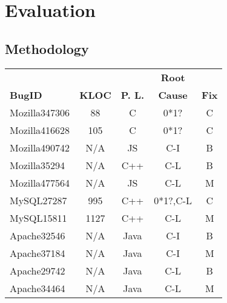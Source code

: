 \section{Evaluation}
\label{sec:6_experiment}

\subsection{Methodology}
\label{sec:6_result_meth}


\begin{table}
  \centering
  \scriptsize
  \newcommand{\Yes}[1]{\checkmark{}$_#1$}
  \newcommand{\No}[0]{-}
  \begin{tabular}{lcccc}
    \toprule
                         &      	   &                        & {\bf Root}   &          \\
   {\bf BugID}           &  {\bf KLOC}     &  {\bf P. L.}           & {\bf Cause}  & {\bf Fix}\\
   \midrule
   Mozilla347306         & 88              & C                      &  0*1?        & C     \\
   Mozilla416628         & 105             & C                      &  0*1?        & C     \\
   Mozilla490742         & N/A             & JS                     &  C-I         & B       \\
   Mozilla35294          & N/A             & C++                    &  C-L         & B        \\ 
   Mozilla477564         & N/A             & JS                     &  C-L         & M       \\
   \midrule 
   MySQL27287            & 995             & C++                    &  0*1?,C-L        & C     \\
   MySQL15811            & 1127            & C++                    &  C-L         & M \\ 
   \midrule    
   Apache32546           & N/A             & Java                   &  C-I         & B  \\
   Apache37184           & N/A             & Java                   &  C-I         & M  \\
   Apache29742           & N/A             & Java                   &  C-L         & B \\ 
   Apache34464           & N/A             & Java                   &  C-L         & M  \\

\end{tabular}
\end{table}
